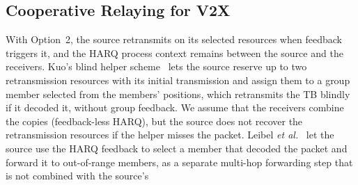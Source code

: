 \documentclass[conference]{IEEEtran}
\begin{document}
\subsection{Cooperative Relaying for V2X}
With Option~2, the source retransmits on its selected resources when feedback triggers it, and the HARQ
process context remains between the source and the receivers. Kuo's blind helper
scheme~\cite{kuo2021reliable} lets the source reserve up to two retransmission resources with its initial
transmission and assign them to a group member selected from the members' positions, which retransmits
the TB blindly if it decoded it, without group feedback. We assume
that the receivers combine the copies (feedback-less HARQ), but the source does not recover the
retransmission resources if the helper misses the packet. Leibel \emph{et al.}~\cite{leibel2020harq}
let the source use the HARQ feedback to select a member that decoded the packet and forward it to
out-of-range members, as a separate multi-hop forwarding step that is not combined with the source's
\end{document}
